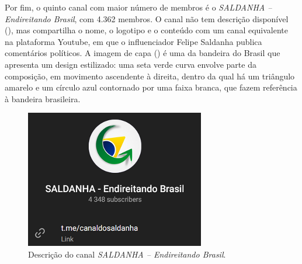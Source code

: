 \documentclass[portuguese]{textolivre}
\begin{document}
Por fim, o quinto canal com maior número de membros é o \emph{SALDANHA -- Endireitando Brasil}, com 4.362 membros. O canal não tem descrição disponível (), mas compartilha o nome, o logotipo e o conteúdo com um canal equivalente na plataforma Youtube, em que o influenciador Felipe Saldanha publica comentários políticos. A imagem de capa () é uma da bandeira do Brasil que apresenta um design estilizado: uma seta verde curva envolve parte da composição, em movimento ascendente à direita, dentro da qual há um triângulo amarelo e um círculo azul contornado por uma faixa branca, que fazem referência à bandeira brasileira.

\begin{figure}[h!]
\centering
\begin{minipage}[t]{0.50\textwidth}
\centering
\includegraphics[width=\linewidth]{Imagens/Fig9.png}
\caption{Descrição do canal \emph{SALDANHA -- Endireitando Brasil}.}
\label{fig-9}
\end{minipage}
\hfill
\begin{minipage}[t]{0.38\textwidth}
\centering

\end{minipage}
\end{figure}
\end{document}
